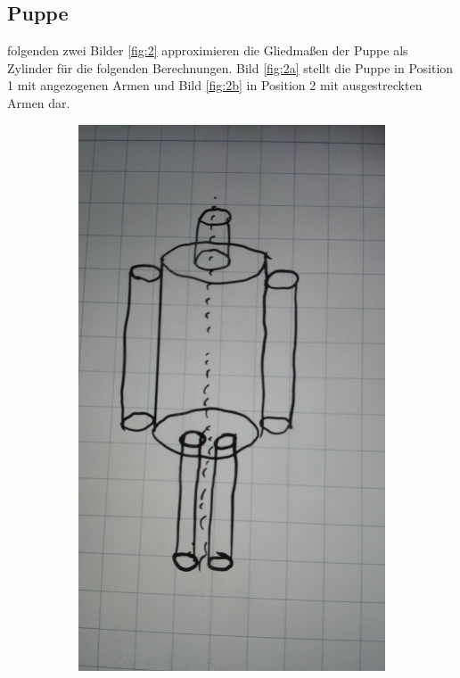 \subsection{Puppe}\justifying %

\justifying folgenden zwei Bilder \ref{fig:2} approximieren die Gliedmaßen der Puppe als Zylinder für die folgenden 
Berechnungen. Bild \ref{fig:2a} stellt die Puppe in Position 1 mit angezogenen Armen und Bild \ref{fig:2b} in Position 2 mit 
ausgestreckten Armen dar.
\begin{figure}[H]
\caption{Positionen der Puppe}
\begin{subfigure}{0.495\linewidth}
\centering
\includegraphics[width=\textwidth]{images/puppe_an.jpg}

\end{subfigure}
\end{figure}
